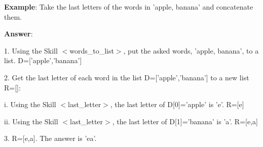 \documentclass{article} %
\begin{document}
\newpage

\begin{tcolorbox}[title = {An Example of Skill Composition for Last Letter Concatenation}, colback = Apricot!25!white, colframe = BrickRed!75!black] 
\textbf{Example}: Take the last letters of the words in 'apple, banana' and concatenate them.

\quad

\textbf{Answer}:

1. Using the Skill $<$words\_to\_list$>$, put the asked words, 'apple, banana', to a list. D=['apple','banana'] 

\quad 


2. Get the last letter of each word in the list D=['apple','banana'] to a new list R=[]: 

\quad 
      \qquad i. Using the Skill $<$last\_letter$>$, the last letter of D[0]='apple' is 'e'. R=[e] 
      
     \qquad ii. Using the Skill $<$last\_letter$>$, the last letter of D[1]='banana' is 'a'. R=[e,a] 

\quad 

3. R=[e,a]. The answer is 'ea'.   
\end{tcolorbox}
\noindent\begin{minipage}{\textwidth}
 \label{Tab:compose_last_letter_skill}
\end{minipage}


\newpage
\end{document}
